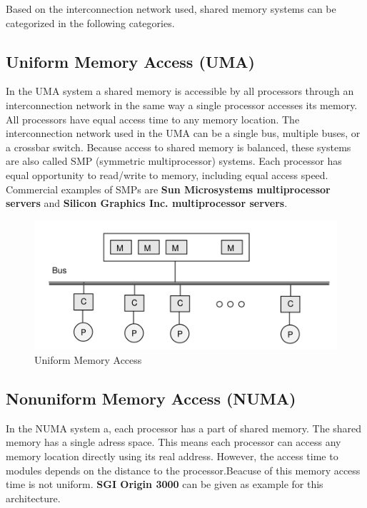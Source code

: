 \documentclass[11pt]{article}
\begin{document}
Based on the interconnection network used, shared
memory systems can be categorized in the following categories.

\subsection{Uniform Memory Access (UMA)}
In the UMA system a shared memory is accessible by all processors through an
interconnection network in the same way a single processor accesses its memory.
All processors have equal access time to any memory location. The interconnection
network used in the UMA can be a single bus, multiple buses, or a crossbar switch.
Because access to shared memory is balanced, these systems are also called SMP
(symmetric multiprocessor) systems. Each processor has equal opportunity to
read/write to memory, including equal access speed. Commercial examples of
SMPs are \textbf{Sun Microsystems multiprocessor servers} and \textbf{Silicon Graphics Inc. multiprocessor servers}.
\begin{figure}[htp]
\centering
\includegraphics[scale=0.30]{uma.png}
\caption{Uniform Memory Access}
\end{figure}

\subsection{Nonuniform Memory Access (NUMA)}
In the NUMA system a, each processor has a part of shared memory. The shared memory has a single adress space. This means each processor can access any memory location directly using its real address. However, the access time to modules depends on the distance to the processor.Beacuse of this memory access time is not uniform. \textbf{SGI Origin 3000} can be given as example for this architecture.
\end{document}
